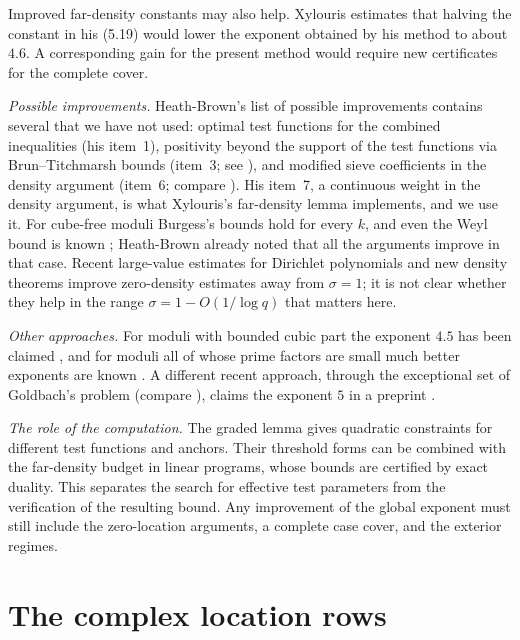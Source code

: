 \documentclass[11pt]{amsart}
\numberwithin{equation}{section}
\theoremstyle{plain}
\theoremstyle{definition}
\theoremstyle{remark}
\newcommand{\1}{\mathbf{1}}
\begin{document}
Improved far-density constants may also help. Xylouris estimates
\cite[p.~87]{Xylouris2011nullstellen} that halving the constant in his (5.19) would lower
the exponent obtained by his method to about $4.6$. A corresponding gain for the
present method would require new certificates for the complete cover.

\emph{Possible improvements.} Heath-Brown's list of possible improvements
\cite[\S16]{HeathBrown1992zero} contains several that we have not used: optimal test functions
for the combined inequalities (his item~1), positivity beyond the support of the test functions via
Brun--Titchmarsh bounds (item~3; see \cite{Titchmarsh1930divisor,MontgomeryVaughan1973large,
Iwaniec1982brun,Maynard2013brun}), and modified sieve coefficients in the density argument (item~6;
compare \cite{FriedlanderIwaniec2023selberg}). His item~7, a continuous weight in the density
argument, is what Xylouris's far-density lemma implements, and we use it. For cube-free moduli Burgess's bounds hold for every $k$, and even the
Weyl bound is known \cite{PetrowYoung2020weyl}; Heath-Brown already noted that all the arguments
improve in that case. Recent large-value estimates for Dirichlet polynomials
\cite{GuthMaynard2026new,ChenGuptaLi2025large,TaoTrudgianYang2026new} and new density theorems
\cite{Pintz2019some} improve zero-density estimates away from $\sigma=1$; it is not clear
whether they help in the range $\sigma=1-O(1/\log q)$ that matters here.

\emph{Other approaches.} For moduli with bounded cubic part the exponent $4.5$ has been claimed
\cite{Meng2010note}, and for moduli all of whose prime factors are small much better
exponents are known \cite{Chang2014short}. A different recent approach, through the exceptional set of Goldbach's problem (compare
\cite{Pintz2018new}), claims the exponent $5$ in a preprint \cite{Zhao2025exceptional}.

\emph{The role of the computation.} The graded lemma gives quadratic constraints for
different test functions and anchors. Their threshold forms can be combined with the
far-density budget in linear programs, whose bounds are certified by exact duality.
This separates the search for effective test parameters from the verification of the
resulting bound. Any improvement of the global exponent must still include the
zero-location arguments, a complete case cover, and the exterior regimes.

\appendix
\section{The complex location rows}\label{app:rows}
\end{document}
